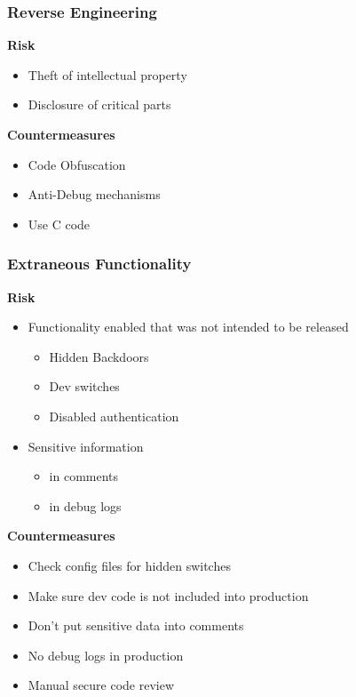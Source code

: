 \subsubsection{Reverse Engineering}
\textbf{Risk}
\begin{itemize}
    \item Theft of intellectual property
    \item Disclosure of critical parts
\end{itemize}
\textbf{Countermeasures}
\begin{itemize}
    \item Code Obfuscation
    \item Anti-Debug mechanisms
    \item Use C code
\end{itemize}

\subsubsection{Extraneous Functionality}
\textbf{Risk}
\begin{itemize}
    \item Functionality enabled that was not intended to be released
    \begin{itemize}
        \item Hidden Backdoors
        \item Dev switches
        \item Disabled authentication
    \end{itemize}
    \item Sensitive information
    \begin{itemize}
        \item in comments
        \item in debug logs
    \end{itemize}
\end{itemize}
\textbf{Countermeasures}
\begin{itemize}
    \item Check config files for hidden switches
    \item Make sure dev code is not included into production
    \item Don't put sensitive data into comments
    \item No debug logs in production
    \item Manual secure code review
\end{itemize}

